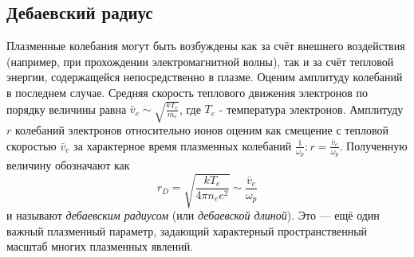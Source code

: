 \subsection*{Дебаевский радиус}

Плазменные колебания могут быть возбуждены как за счёт внешнего воздействия (например, при прохождении электромагнитной волны), так и за счёт тепловой энергии, содержащейся непосредственно в плазме. Оценим амплитуду колебаний в последнем случае. Средняя скорость теплового движения электронов по порядку величины равна $\bar v_e \sim \sqrt{\frac{k T_e}{m_e}}$, где $T_e$ - температура электронов. Амплитуду $r$ колебаний электронов относительно ионов оценим как смещение с тепловой скоростью $\bar v_e$ за характерное время плазменных колебаний $\frac{1}{\omega_p}: r = \frac{\bar v_e}{\omega_p}$. Полученную величину обозначают как
$$
r_D = \sqrt{\frac{k T_e}{4 \pi n_e e^2}} \sim \frac{\bar v_e}{\omega_p}
$$
и называют \textit{дебаевским радиусом} (или \textit{дебаевской длиной}). Это --- ещё один важный плазменный параметр, задающий характерный пространственный масштаб многих плазменных явлений.

